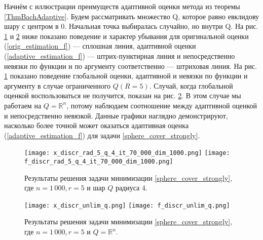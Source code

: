 Начнём с иллюстрации преимуществ адаптивной оценки метода \cite{Bach_2012} из теоремы \ref{ThmBachAdaptive}. Будем рассматривать множество Q, которое равно евклидову шару с центром в 0. Начальная точка выбиралась случайно, но внутри Q. На рис. \ref{res_ex_strong_r5} и \ref{res_ex_strong_unlim} ниже показано поведение и характер убывания для оригинальной оценки (\ref{orig_estimation_f}) --- сплошная линия, адаптивной оценки (\ref{adaptive_estimation_f}) --- штрих-пунктирная линия и непосредственно невязки по функции и по аргументу соответственно --- штриховая линия. На рис. \ref{res_ex_strong_r5} показано поведение глобальной оценки, адаптивной и невязки по функции и аргументу в случае ограниченного $Q (R = 5)$. Случай, когда глобальной оценкой воспользоваться не получится, показан на рис. \ref{res_ex_strong_unlim}. В этом случае мы работаем на $Q = \mathbb{R}^n$, потому наблюдаем соотношение между адаптивной оценкой и непосредственно невязкой. Данные графики наглядно демонстрируют, насколько более точной может оказаться адаптивная оценка (\ref{adaptive_estimation_f}) для задачи \eqref{sphere_cover_strongly}. 

\begin{figure}[H]
	\texttt{[image: x\_discr\_rad\_5\_q\_4\_it\_70\_000\_dim\_1000.png]}
	\endminipage\hfill
	\texttt{[image: f\_discr\_rad\_5\_q\_4\_it\_70\_000\_dim\_1000.png]}
	\endminipage\hfill
	\caption{Результаты решения задачи минимизации \eqref{sphere_cover_strongly}, где  $n= 1\,000, r = 5$ и  шар $Q$ радиуса 4.}
	\label{res_ex_strong_r5}
\end{figure}

\begin{figure}[H]
	\texttt{[image: x\_discr\_unlim\_q.png]}
	\endminipage\hfill
	\texttt{[image: f\_discr\_unlim\_q.png]}
	\endminipage\hfill
	\caption{ Результаты решения задачи минимизации \ref{sphere_cover_strongly}, где  $n= 1\,000, r = 5$ и  $Q = \mathbb{R}^n$.}
	\label{res_ex_strong_unlim}
\end{figure}

